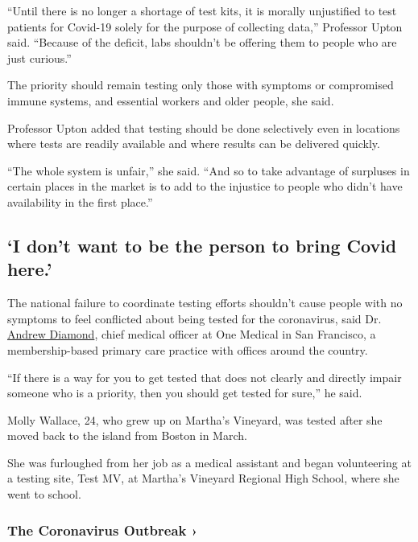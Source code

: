 ``Until there is no longer a shortage of test kits, it is morally
unjustified to test patients for Covid-19 solely for the purpose of
collecting data,'' Professor Upton said. ``Because of the deficit, labs
shouldn't be offering them to people who are just curious.''

The priority should remain testing only those with symptoms or
compromised immune systems, and essential workers and older people, she
said.

Professor Upton added that testing should be done selectively even in
locations where tests are readily available and where results can be
delivered quickly.

``The whole system is unfair,'' she said. ``And so to take advantage of
surpluses in certain places in the market is to add to the injustice to
people who didn't have availability in the first place.''

\hypertarget{i-dont-want-to-be-the-person-to-bring-covid-here}{%
\subsection{`I don't want to be the person to bring Covid
here.'}\label{i-dont-want-to-be-the-person-to-bring-covid-here}}

The national failure to coordinate testing efforts shouldn't cause
people with no symptoms to feel conflicted about being tested for the
coronavirus, said Dr.
\href{https://www.onemedical.com/providers/andrew-diamond/}{Andrew
Diamond}, chief medical officer at One Medical in San Francisco, a
membership-based primary care practice with offices around the country.

``If there is a way for you to get tested that does not clearly and
directly impair someone who is a priority, then you should get tested
for sure,'' he said.

Molly Wallace, 24, who grew up on Martha's Vineyard, was tested after
she moved back to the island from Boston in March.

She was furloughed from her job as a medical assistant and began
volunteering at a testing site, Test MV, at Martha's Vineyard Regional
High School, where she went to school.

\href{https://www.nytimes3xbfgragh.onion/news-event/coronavirus?action=click\&pgtype=Article\&state=default\&region=MAIN_CONTENT_3\&context=storylines_faq}{}

\hypertarget{the-coronavirus-outbreak-}{%
\subsubsection{The Coronavirus Outbreak
›}\label{the-coronavirus-outbreak-}}

